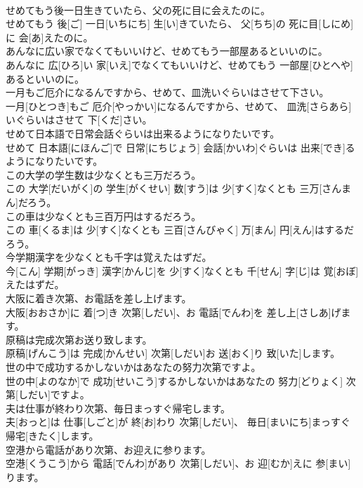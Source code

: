 \documentclass[8pt]{extreport}
\begin{document}
\begin{CJK}{UTF8}{min}
\\	せめてもう後一日生きていたら、父の死に目に会えたのに。	
\\	せめてもう 後[ご] 一日[いちにち] 生[い]きていたら、 父[ちち]の 死に目[しにめ]に 会[あ]えたのに。
\\	あんなに広い家でなくてもいいけど、せめてもう一部屋あるといいのに。	
\\	あんなに 広[ひろ]い 家[いえ]でなくてもいいけど、せめてもう 一部屋[ひとへや]あるといいのに。
\\	一月もご厄介になるんですから、せめて、皿洗いぐらいはさせて下さい。	
\\	一月[ひとつき]もご 厄介[やっかい]になるんですから、せめて、 皿洗[さらあら]いぐらいはさせて 下[くだ]さい。
\\	せめて日本語で日常会話ぐらいは出来るようになりたいです。	
\\	せめて 日本語[にほんご]で 日常[にちじょう] 会話[かいわ]ぐらいは 出来[でき]るようになりたいです。
\\	この大学の学生数は少なくとも三万だろう。	
\\	この 大学[だいがく]の 学生[がくせい] 数[すう]は 少[すく]なくとも 三万[さんまん]だろう。
\\	この車は少なくとも三百万円はするだろう。	
\\	この 車[くるま]は 少[すく]なくとも 三百[さんびゃく] 万[まん] 円[えん]はするだろう。
\\	今学期漢字を少なくとも千字は覚えたはずだ。	
\\	今[こん] 学期[がっき] 漢字[かんじ]を 少[すく]なくとも 千[せん] 字[じ]は 覚[おぼ]えたはずだ。
\\	大阪に着き次第、お電話を差し上げます。	
\\	大阪[おおさか]に 着[つ]き 次第[しだい]、お 電話[でんわ]を 差し上[さしあ]げます。
\\	原稿は完成次第お送り致します。	
\\	原稿[げんこう]は 完成[かんせい] 次第[しだい]お 送[おく]り 致[いた]します。
\\	世の中で成功するかしないかはあなたの努力次第ですよ。	
\\	世の中[よのなか]で 成功[せいこう]するかしないかはあなたの 努力[どりょく] 次第[しだい]ですよ。
\\	夫は仕事が終わり次第、毎日まっすぐ帰宅します。	
\\	夫[おっと]は 仕事[しごと]が 終[お]わり 次第[しだい]、 毎日[まいにち]まっすぐ 帰宅[きたく]します。
\\	空港から電話があり次第、お迎えに参ります。	
\\	空港[くうこう]から 電話[でんわ]があり 次第[しだい]、お 迎[むか]えに 参[まい]ります。

\end{CJK}
\end{document}
